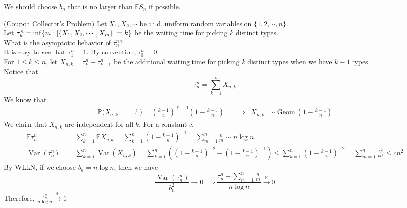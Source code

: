 \documentclass{huhtakm-template-book}
\newcommand{\prob}{\mathbb{P}}
\newcommand{\expect}{\mathbb{E}}
\DeclareMathOperator{\Geom}{Geom}
\DeclareMathOperator{\Var}{Var}
\begin{document}
    \begin{rem}
        We should choose $b_{n}$ that is no larger than $\expect S_{n}$ if possible.
    \end{rem}
    \begin{eg}(Coupon Collector's Problem) 
        Let $X_{1},X_{2},\cdots$ be i.i.d. uniform random variables on $\{1,2,\cdots,n\}$.\\
        Let $\tau_{k}^{n}=\inf\{m:\left|{\{X_{1},X_{2},\cdots,X_{m}\}}\right|=k\}$ be the waiting time for picking $k$ distinct types.\\
        What is the asymptotic behavior of $\tau_{n}^{n}$?\\
        It is easy to see that $\tau_{1}^{n}=1$. By convention, $\tau_{0}^{n}=0$.\\
        For $1\leq k\leq n$, let $X_{n,k}=\tau_{k}^{n}-\tau_{k-1}^{n}$ be the additional waiting time for picking $k$ distinct types when we have $k-1$ types.\\
        Notice that
        \begin{equation*}
            \tau_{n}^{n}=\sum_{k=1}^{n}X_{n,k}
        \end{equation*}
        We know that
        \begin{align*}
            \prob(X_{n,k}&=\ell)=\left(\frac{k-1}{n}\right)^{\ell-1}\left(1-\frac{k-1}{n}\right) & &\implies & X_{n,k}&\sim\Geom\left(1-\frac{k-1}{n}\right)
        \end{align*}
        We claim that $X_{n,k}$ are independent for all $k$. For a constant $c$,
        \begin{align*}
            \expect\tau_{n}^{n}&=\sum_{k=1}^{n}\expect X_{n,k}=\sum_{k=1}^{n}\left(1-\frac{k-1}{n}\right)^{-1}=\sum_{m=1}^{n}\frac{n}{m}\sim n\log n\\
            \Var(\tau_{n}^{n})&=\sum_{k=1}^{n}\Var(X_{n,k})=\sum_{k=1}^{n}\left(\left(1-\frac{k-1}{n}\right)^{-2}-\left(1-\frac{k-1}{n}\right)^{-1}\right)\leq\sum_{k=1}^{n}\left(1-\frac{k-1}{n}\right)^{-2}=\sum_{m=1}^{n}\frac{n^{2}}{m^{2}}\leq cn^{2}
        \end{align*}
        By WLLN, if we choose $b_{n}=n\log n$, then we have
        \begin{equation*}
            \frac{\Var(\tau_{n}^{n})}{b_{n}^{2}}\to 0\implies\frac{\tau_{n}^{n}-\sum_{m=1}^{n}\frac{n}{m}}{n\log n}\xrightarrow{\prob}0
        \end{equation*}
        Therefore, $\frac{\tau_{n}^{n}}{n\log n}\xrightarrow{\prob}1$
    \end{eg}
\end{document}
